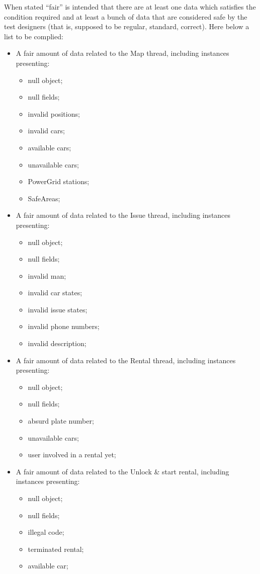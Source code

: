 \documentclass{scrreprt}
\begin{document}
When stated ``fair'' is intended that there are at least one data which satisfies the condition required and at least a bunch of data that are considered safe by the test designers (that is, supposed to be regular, standard, correct).
Here below a list to be complied:
\begin{itemize}

\item A fair amount of data related to the Map thread, including instances presenting:
	\begin{itemize}
	\item null object;
	\item null fields;
	\item invalid positions;
	\item invalid cars;
	\item available cars;
	\item unavailable cars;
	\item PowerGrid stations;
	\item SafeAreas;
	\end{itemize}

\item A fair amount of data related to the Issue thread, including instances presenting:
	\begin{itemize}
	\item null object;
	\item null fields;
	\item invalid man;
	\item invalid car states;
	\item invalid issue states;
	\item invalid phone numbers;
	\item invalid description;
	\end{itemize}

\item A fair amount of data related to the Rental thread, including instances presenting:
\begin{itemize}
	\item null object;
	\item null fields;
	\item absurd plate number;
	\item unavailable cars;
	\item user involved in a rental yet;
	\end{itemize}

\item A fair amount of data related to the Unlock \& start rental, including instances presenting:
\begin{itemize}
	\item null object;
	\item null fields;
	\item illegal code;
	\item terminated rental;
	\item available car;
	\end{itemize}


\end{itemize}
\end{document}
